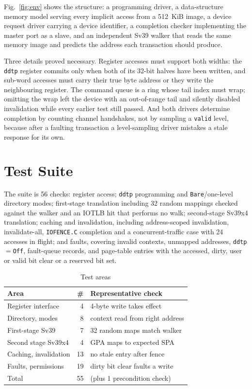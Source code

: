 \documentclass[conference]{IEEEtran}
\newcommand{\cmd}[1]{\mbox{\texttt{#1}}}
\begin{document}
Fig.~\ref{fig:env} shows the structure: a programming driver, a data-structure
memory model serving every implicit access from a 512~KiB image, a device
request driver carrying a device identifier, a completion checker implementing
the master port as a slave, and an independent Sv39 walker that reads the same
memory image and predicts the address each transaction should produce.

Three details proved necessary. Register accesses must support both widths: the
\texttt{ddtp} register commits only when both of its 32-bit halves have been
written, and sub-word accesses must carry their true byte address or they write
the neighbouring register. The command queue is a ring whose tail index must
wrap; omitting the wrap left the device with an out-of-range tail and silently
disabled invalidation while every earlier test still passed. And both drivers
determine completion by counting channel handshakes, not by sampling a
\texttt{valid} level, because after a faulting transaction a level-sampling
driver mistakes a stale response for its own.

\section{Test Suite}
The suite is 56 checks: register access; \texttt{ddtp} programming and
\texttt{Bare}/one-level directory modes; first-stage translation including 32
random mappings checked against the walker and an IOTLB hit that performs no
walk; second-stage Sv39x4 translation; caching and invalidation, including
address-scoped invalidation, invalidate-all, \cmd{IOFENCE.C} completion and a
concurrent-traffic case with 24 accesses in flight; and faults, covering invalid
contexts, unmapped addresses, \texttt{ddtp}$=$\texttt{Off}, fault-queue records,
and page-table entries with the accessed, dirty, user or valid bit clear or a
reserved bit set. \begin{table}[!t]
\caption{Test areas}
\label{tab:areas}
\centering\footnotesize
\begin{tabular}{lrl}
\toprule
Area & \# & Representative check \\
\midrule
Register interface    & 4  & 4-byte write takes effect \\
Directory, modes      & 8  & context read from right address \\
First-stage Sv39      & 7  & 32 random maps match walker \\
Second stage Sv39x4   & 4  & GPA maps to expected SPA \\
Caching, invalidation & 13 & no stale entry after fence \\
Faults, permissions   & 19 & dirty bit clear faults a write \\
\midrule
Total                 & 55 & (plus 1 precondition check) \\
\bottomrule
\end{tabular}
\end{table}
\end{document}
